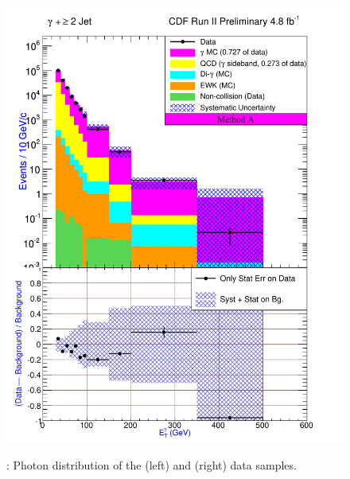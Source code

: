\documentclass[11pt]{article}
\begin{document}
\begin{figure}[h!]
{ \includegraphics[scale=\resultsHistScale,keepaspectratio=true]{./g30jet_MtdA_plot2_Et_pho.pdf}
}

 \caption{: Photon \et distribution of the \phoonejet (left) and \photwojet (right) data samples.}
 \label{fig:Result_MtdA_gj1_PhoEt}
\end{figure}
\end{document}
